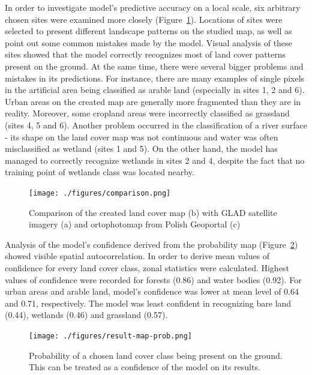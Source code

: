 \documentclass{amuthesis}
\begin{document}
In order to investigate model's predictive accuracy on a local scale,
six arbitrary chosen sites were examined more closely
(Figure~\ref{fig-rycina10}). Locations of sites were selected to present
different landscape patterns on the studied map, as well as point out
some common mistakes made by the model. Visual analysis of these sites
showed that the model correctly recognizes most of land cover patterns
present on the ground. At the same time, there were several bigger
problems and mistakes in its predictions. For instance, there are many
examples of single pixels in the artificial area being classified as
arable land (especially in sites 1, 2 and 6). Urban areas on the created
map are generally more fragmented than they are in reality. Moreover,
some cropland areas were incorrectly classified as grassland (sites 4, 5
and 6). Another problem occurred in the classification of a river
surface - its shape on the land cover map was not continuous and water
was often misclassified as wetland (sites 1 and 5). On the other hand,
the model has managed to correctly recognize wetlands in sites 2 and 4,
despite the fact that no training point of wetlands class was located
nearby.

\begin{figure}[H]

{\centering \texttt{[image: ./figures/comparison.png]}

}

\caption{\label{fig-rycina10}Comparison of the created land cover map
(b) with GLAD satellite imagery (a) and ortophotomap from Polish
Geoportal (c)}

\end{figure}

Analysis of the model's confidence derived from the probability map
(Figure~\ref{fig-rycina11}) showed visible spatial autocorrelation. In
order to derive mean values of confidence for every land cover class,
zonal statistics were calculated. Highest values of confidence were
recorded for forests (0.86) and water bodies (0.92). For urban areas and
arable land, model's confidence was lower at mean level of 0.64 and
0.71, respectively. The model was least confident in recognizing bare
land (0.44), wetlands (0.46) and grassland (0.57).

\begin{figure}[H]

{\centering \texttt{[image: ./figures/result-map-prob.png]}

}

\caption{\label{fig-rycina11}Probability of a chosen land cover class
being present on the ground. This can be treated as a confidence of the
model on its results.}

\end{figure}
\end{document}

